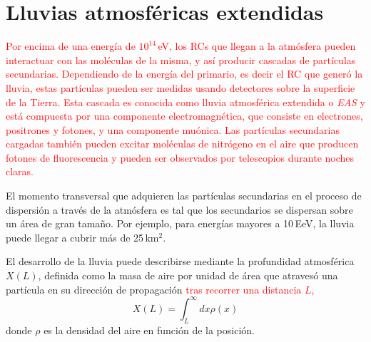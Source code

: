 
\section{Lluvias atmosféricas extendidas}


\textcolor{red}{Por encima de una energía de $10^{14}\,$eV, los RCs que llegan a la atmósfera pueden interactuar con las moléculas de la misma,  y así producir cascadas de partículas secundarias. Dependiendo de la energía del primario, es decir el RC que generó la lluvia, estas partículas pueden ser medidas usando detectores sobre la superficie de la Tierra. Esta cascada es conocida como lluvia atmosférica extendida o \emph{EAS} y está compuesta por una componente electromagnética, que consiste en electrones, positrones y fotones, y una componente muónica. Las partículas secundarias cargadas también pueden excitar moléculas de nitrógeno en el aire que producen fotones de fluorescencia y pueden ser observados por telescopios durante noches claras.}

El momento transversal que adquieren las partículas secundarias en el proceso de dispersión a través de la atmósfera es tal que los secundarios se dispersan sobre un área de gran tamaño. Por ejemplo, para energías mayores a 10$\,$EeV,  la lluvia puede llegar a cubrir más de 25\,km$^2$. 

El desarrollo de la lluvia puede describirse mediante la profundidad atmosférica $X(L)$, definida como la masa de aire por unidad de área que atravesó una partícula en su dirección de propagación \textcolor{red}{tras recorrer una distancia $L$,} 
\begin{equation}
	X(L)= \int_L^\infty dx \rho(x)
\end{equation}
donde $\rho$ es la densidad del aire en función de la posición.


